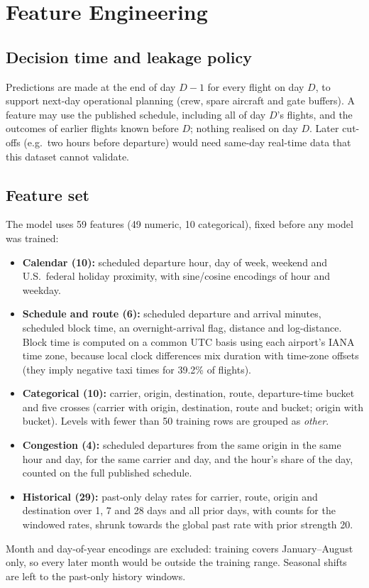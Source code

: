 \section{Feature Engineering}
\label{sec:features}

\subsection{Decision time and leakage policy}
Predictions are made at the end of day $D{-}1$ for every flight on day $D$, to support next-day
operational planning (crew, spare aircraft and gate buffers). A feature may use the published
schedule, including all of day $D$'s flights, and the outcomes of earlier flights known before
$D$; nothing realised on day $D$. Later cut-offs (e.g.\ two hours before departure) would need
same-day real-time data that this dataset cannot validate.

\subsection{Feature set}
The model uses 59 features (49 numeric, 10 categorical), fixed before any model was trained:
\begin{itemize}
  \item \textbf{Calendar (10):} scheduled departure hour, day of week, weekend and U.S.\ federal
  holiday proximity, with sine/cosine encodings of hour and weekday.
  \item \textbf{Schedule and route (6):} scheduled departure and arrival minutes, scheduled block
  time, an overnight-arrival flag, distance and log-distance. Block time is computed on a common
  UTC basis using each airport's IANA time zone, because local clock differences mix duration with
  time-zone offsets (they imply negative taxi times for 39.2\% of flights).
  \item \textbf{Categorical (10):} carrier, origin, destination, route, departure-time bucket and
  five crosses (carrier with origin, destination, route and bucket; origin with bucket). Levels with
  fewer than 50 training rows are grouped as \emph{other}.
  \item \textbf{Congestion (4):} scheduled departures from the same origin in the same hour and day,
  for the same carrier and day, and the hour's share of the day, counted on the full published
  schedule.
  \item \textbf{Historical (29):} past-only delay rates for carrier, route, origin and destination
  over 1, 7 and 28 days and all prior days, with counts for the windowed rates, shrunk towards the
  global past rate with prior strength 20.
\end{itemize}
Month and day-of-year encodings are excluded: training covers January--August only, so every later
month would be outside the training range. Seasonal shifts are left to the past-only history
windows.


